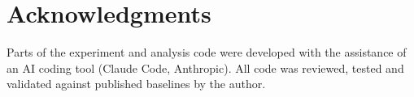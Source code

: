 \section*{Acknowledgments}
Parts of the experiment and analysis code were developed with the assistance of an AI coding tool (Claude Code, Anthropic). All code was reviewed, tested and validated against published baselines by the author.
